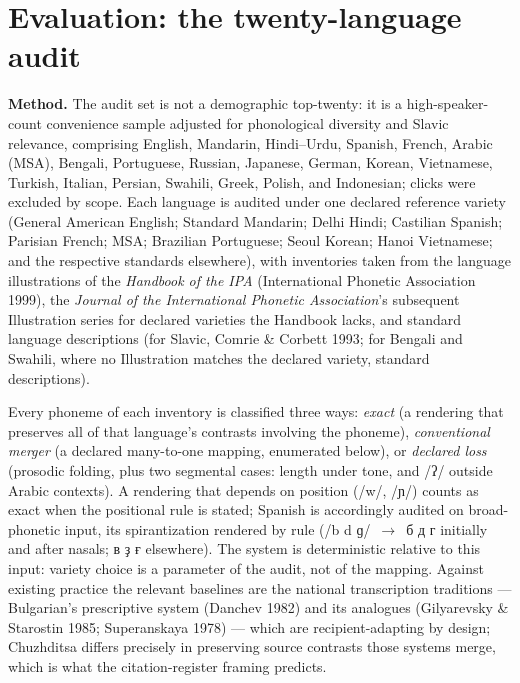 \documentclass[11pt]{article}
\newcommand{\cz}[1]{{\chu #1}}
\newcommand{\ph}[1]{{\ipafont/#1/}}
\begin{document}
\section{Evaluation: the twenty-language audit}\label{sec:audit}

\textbf{Method.} The audit set is not a demographic top-twenty: it is a high-speaker-count convenience sample adjusted for phonological diversity and Slavic relevance, comprising English, Mandarin, Hindi--Urdu, Spanish, French, Arabic (MSA), Bengali, Portuguese, Russian, Japanese, German, Korean, Vietnamese, Turkish, Italian, Persian, Swahili, Greek, Polish, and Indonesian; clicks were excluded by scope. Each language is audited under one declared reference variety (General American English; Standard Mandarin; Delhi Hindi; Castilian Spanish; Parisian French; MSA; Brazilian Portuguese; Seoul Korean; Hanoi Vietnamese; and the respective standards elsewhere), with inventories taken from the language illustrations of the \emph{Handbook of the IPA} (International Phonetic Association 1999), the \emph{Journal of the International Phonetic Association}'s subsequent Illustration series for declared varieties the Handbook lacks, and standard language descriptions (for Slavic, Comrie \& Corbett 1993; for Bengali and Swahili, where no Illustration matches the declared variety, standard descriptions).

Every phoneme of each inventory is classified three ways: \emph{exact} (a rendering that preserves all of that language's contrasts involving the phoneme), \emph{conventional merger} (a declared many-to-one mapping, enumerated below), or \emph{declared loss} (prosodic folding, plus two segmental cases: length under tone, and \ph{ʔ} outside Arabic contexts). A rendering that depends on position (\ph{w}, \ph{ɲ}) counts as exact when the positional rule is stated; Spanish is accordingly audited on broad-phonetic input, its spirantization rendered by rule (\ph{b d ɡ}~$\rightarrow$~\cz{б д г} initially and after nasals; \cz{в ҙ ғ} elsewhere). The system is deterministic relative to this input: variety choice is a parameter of the audit, not of the mapping. Against existing practice the relevant baselines are the national transcription traditions — Bulgarian's prescriptive system (Danchev 1982) and its analogues (Gilyarevsky \& Starostin 1985; Superanskaya 1978) — which are recipient-adapting by design; Chuzhditsa differs precisely in preserving source contrasts those systems merge, which is what the citation-register framing predicts.
\end{document}
